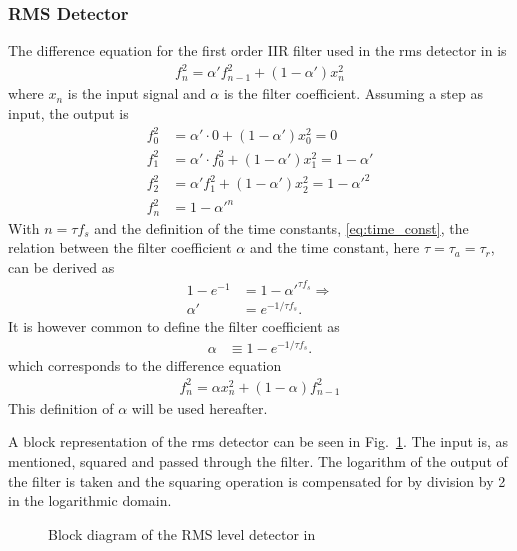 \documentclass[../main2.tex]{subfiles}
\providecommand{\rootdir}{..}
\begin{document}
\subsubsection{RMS Detector}
The difference equation for the first order IIR filter used in the rms detector in \cite{mcnally1984dynamic} is
\begin{align*}
f_n^2 = \alpha' f_{n-1}^2+ (1-\alpha') x_n^2
\end{align*}
where $x_n$ is the input signal and $\alpha$ is the filter coefficient. Assuming a step as input, the output is
\begin{align*}
f_0^2 &= \alpha' \cdot 0 + (1-\alpha')x_0^2 = 0 \\
f_1^2 &= \alpha' \cdot f_0^2 + (1-\alpha')x_1^2 = 1-\alpha'\\
f_2^2 &= \alpha' f_1^2+ (1-\alpha')x_2^2 = 1-\alpha'^2 \\
f_n^2 &= 1-\alpha'^{n}
\end{align*}
With $n = \tau f_s$ and the definition of the time constants, \eqref{eq:time_const}, the relation between the filter coefficient $\alpha$ and the time constant, here $\tau = \tau_a = \tau_r$, can be derived as
\begin{align*}
1-e^{-1} &= 1-\alpha'^{\tau f_s} \Longrightarrow \\
\alpha' &= e^{-1/\tau f_s}.
\end{align*}
It is however common to define the filter coefficient as
\begin{align}
\alpha &\equiv 1-e^{-1/\tau f_s}.
\end{align}
which corresponds to the difference equation
\begin{align}
f_n^2 = \alpha x_n^2 + (1-\alpha) f_{n-1}^2
\end{align}
This definition of $\alpha$ will be used hereafter.

A block representation of the rms detector can be seen in Fig.~\ref{fig:block_mcnally_theory_rms}. The input is, as mentioned, squared and passed through the filter. The logarithm of the output of the filter is taken and the squaring operation is compensated for by division by 2 in the logarithmic domain.
\begin{figure}
\centerline{}
\caption{Block diagram of the RMS level detector in \cite{mcnally1984dynamic}}
\label{fig:block_mcnally_theory_rms}
\end{figure}
\end{document}

